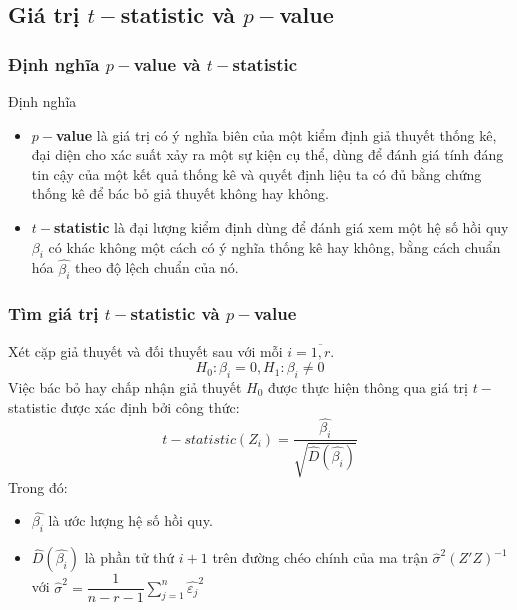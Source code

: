 \begin{footnotesize}
\subsection{Giá trị $t-$statistic và $p-$value}
\begin{frame}
\frametitle{Định nghĩa $p-$value và $t-$statistic}
\begin{block}{Định nghĩa}
\begin{itemize}
   \item \textbf{$p-$value} là giá trị có ý nghĩa biên của một kiểm định giả thuyết thống kê, đại diện cho xác suất xảy ra một sự kiện cụ thể, dùng để đánh giá tính đáng tin cậy của một kết quả thống kê và quyết định liệu ta có đủ bằng chứng thống kê để bác bỏ giả thuyết không hay không.
   \item \textbf{$t-$statistic} là đại lượng kiểm định dùng để đánh giá xem một hệ số hồi quy $\beta_i$ có khác không một cách có ý nghĩa thống kê hay không, bằng cách chuẩn hóa $\widehat{\beta_i}$ theo độ lệch chuẩn của nó.
\end{itemize}
\end{block}
\end{frame}
\begin{frame}
\frametitle{Tìm giá trị $t-$statistic và $p-$value}
   Xét cặp giả thuyết và đối thuyết sau với mỗi $i=\overline{1,r}$.
   \[
   H_0: \beta_i = 0, H_1: \beta_i \ne 0  
   \]
   Việc bác bỏ hay chấp nhận giả thuyết $H_0$ được thực hiện thông qua giá trị $t-$statistic được xác định bởi công thức:
       \[
       t-statistic(Z_i) = \dfrac{\widehat{\beta_i}}{\sqrt{\widehat{D}\left(\widehat{\beta_i}\right)}}
       \]
       Trong đó:
      \begin{itemize}
           \item $\widehat{\beta_i}$ là ước lượng hệ số hồi quy.
           \item $\widehat{D}\left(\widehat{\beta_i}\right)$ là phần tử thứ $i+1$ trên đường chéo chính của ma trận $\widehat{\sigma}^2\left(Z'Z\right)^{-1}$ với $\widehat{\sigma}^2 = \dfrac{1}{n-r-1}\sum_{j=1}^{n}{\widehat{\varepsilon_j}}^2$
       \end{itemize}
       

\end{frame}
\end{footnotesize}
